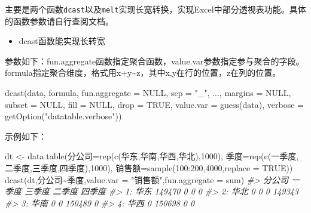 \documentclass[
]{book}
\newenvironment{Shaded}{\begin{snugshade}}{\end{snugshade}}
\newcommand{\AttributeTok}[1]{\textcolor[rgb]{0.77,0.63,0.00}{#1}}
\newcommand{\CommentTok}[1]{\textcolor[rgb]{0.56,0.35,0.01}{\textit{#1}}}
\newcommand{\ConstantTok}[1]{\textcolor[rgb]{0.00,0.00,0.00}{#1}}
\newcommand{\DecValTok}[1]{\textcolor[rgb]{0.00,0.00,0.81}{#1}}
\newcommand{\FunctionTok}[1]{\textcolor[rgb]{0.00,0.00,0.00}{#1}}
\newcommand{\NormalTok}[1]{#1}
\newcommand{\OtherTok}[1]{\textcolor[rgb]{0.56,0.35,0.01}{#1}}
\newcommand{\SpecialCharTok}[1]{\textcolor[rgb]{0.00,0.00,0.00}{#1}}
\newcommand{\StringTok}[1]{\textcolor[rgb]{0.31,0.60,0.02}{#1}}
\providecommand{\tightlist}{%
  \setlength{\itemsep}{0pt}\setlength{\parskip}{0pt}}
\begin{document}
主要是两个函数\texttt{dcast}以及\texttt{melt}实现长宽转换，实现Excel中部分透视表功能。具体的函数参数请自行查阅文档。

\begin{itemize}
\tightlist
\item
  dcast函数能实现长转宽
\end{itemize}

参数如下：fun.aggregate函数指定聚合函数，value.var参数指定参与聚合的字段。formula指定聚合维度，格式用x+y\textasciitilde z，其中x,y在行的位置，z在列的位置。

\begin{Shaded}
\begin{Highlighting}[]
\FunctionTok{dcast}\NormalTok{(data, formula, }\AttributeTok{fun.aggregate =} \ConstantTok{NULL}\NormalTok{, }\AttributeTok{sep =} \StringTok{"\_"}\NormalTok{,}
\NormalTok{    ..., }\AttributeTok{margins =} \ConstantTok{NULL}\NormalTok{, }\AttributeTok{subset =} \ConstantTok{NULL}\NormalTok{, }\AttributeTok{fill =} \ConstantTok{NULL}\NormalTok{,}
    \AttributeTok{drop =} \ConstantTok{TRUE}\NormalTok{, }\AttributeTok{value.var =} \FunctionTok{guess}\NormalTok{(data),}
    \AttributeTok{verbose =} \FunctionTok{getOption}\NormalTok{(}\StringTok{"datatable.verbose"}\NormalTok{))}
\end{Highlighting}
\end{Shaded}

示例如下：

\begin{Shaded}
\begin{Highlighting}[]
\NormalTok{dt }\OtherTok{\textless{}{-}} \FunctionTok{data.table}\NormalTok{(分公司}\OtherTok{=}\FunctionTok{rep}\NormalTok{(}\FunctionTok{c}\NormalTok{(}\StringTok{\textquotesingle{}华东\textquotesingle{}}\NormalTok{,}\StringTok{\textquotesingle{}华南\textquotesingle{}}\NormalTok{,}\StringTok{\textquotesingle{}华西\textquotesingle{}}\NormalTok{,}\StringTok{\textquotesingle{}华北\textquotesingle{}}\NormalTok{),}\DecValTok{1000}\NormalTok{),}
\NormalTok{              季度}\OtherTok{=}\FunctionTok{rep}\NormalTok{(}\FunctionTok{c}\NormalTok{(}\StringTok{\textquotesingle{}一季度\textquotesingle{}}\NormalTok{,}\StringTok{\textquotesingle{}二季度\textquotesingle{}}\NormalTok{,}\StringTok{\textquotesingle{}三季度\textquotesingle{}}\NormalTok{,}\StringTok{\textquotesingle{}四季度\textquotesingle{}}\NormalTok{),}\DecValTok{1000}\NormalTok{),}
\NormalTok{              销售额}\OtherTok{=}\FunctionTok{sample}\NormalTok{(}\DecValTok{100}\SpecialCharTok{:}\DecValTok{200}\NormalTok{,}\DecValTok{4000}\NormalTok{,}\AttributeTok{replace =} \ConstantTok{TRUE}\NormalTok{))}
\FunctionTok{dcast}\NormalTok{(dt,分公司}\SpecialCharTok{\textasciitilde{}}\NormalTok{季度,}\AttributeTok{value.var =} \StringTok{"销售额"}\NormalTok{,}\AttributeTok{fun.aggregate =}\NormalTok{ sum)}
\CommentTok{\#\textgreater{}    分公司 一季度 三季度 二季度 四季度}
\CommentTok{\#\textgreater{} 1:   华东 149470      0      0      0}
\CommentTok{\#\textgreater{} 2:   华北      0      0      0 149343}
\CommentTok{\#\textgreater{} 3:   华南      0      0 150489      0}
\CommentTok{\#\textgreater{} 4:   华西      0 150698      0      0}
\end{Highlighting}
\end{Shaded}
\end{document}
